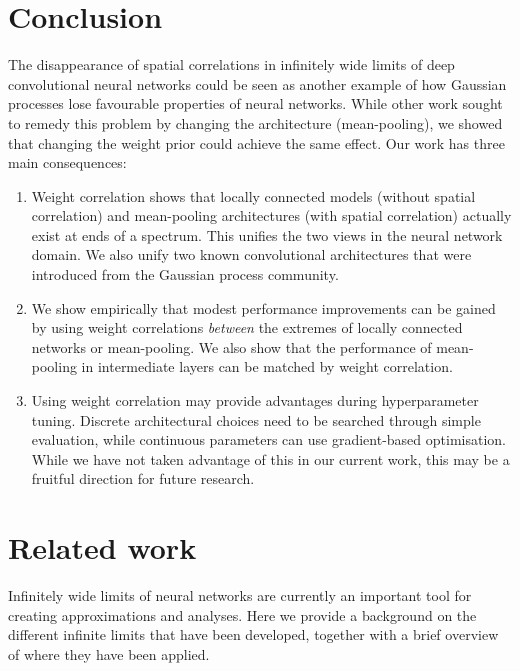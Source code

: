 \documentclass[tablecaption=bottom,wcp,nonatbib]{jmlr} %
\begin{document}
\section{Conclusion}
The disappearance of spatial correlations in infinitely wide limits of deep convolutional neural networks could be seen as another example of how Gaussian processes lose favourable properties of neural networks. While other work sought to remedy this problem by changing the architecture (mean-pooling), we showed that changing the weight prior could achieve the same effect. Our work has three main consequences:
\begin{enumerate}
    \item Weight correlation shows that locally connected models (without spatial correlation) and mean-pooling architectures (with spatial correlation) actually exist at ends of a spectrum. This unifies the two views in the neural network domain. We also unify two known convolutional architectures that were introduced from the Gaussian process community.
    \item We show empirically that modest performance improvements can be gained by using weight correlations \emph{between} the extremes of locally connected networks or mean-pooling. We also show that the performance of mean-pooling in intermediate layers can be matched by weight correlation.
    \item Using weight correlation may provide advantages during hyperparameter tuning. Discrete architectural choices need to be searched through simple evaluation, while continuous parameters can use gradient-based optimisation. While we have not taken advantage of this in our current work, this may be a fruitful direction for future research.
\end{enumerate}












\appendix
\section{Related work}
Infinitely wide limits of neural networks are currently an important tool for creating approximations and analyses. Here we provide a background on the different infinite limits that have been developed, together with a brief overview of where they have been applied.
\end{document}
